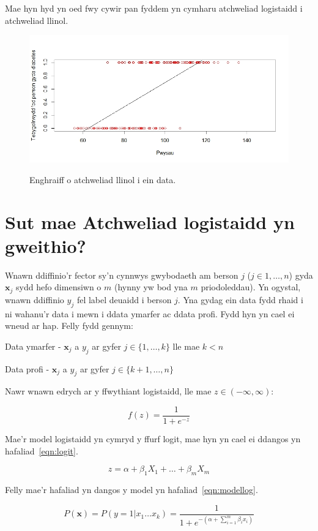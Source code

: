 Mae hyn hyd yn oed fwy cywir pan fyddem yn cymharu atchweliad logistaidd i atchweliad llinol.

\begin{figure}[H]
\begin{center}
\includegraphics[width=0.5\linewidth]{../img/cymharu_llinol.jpeg}
\label{fig:Enghraifft_o_atchweliad_llinol}
\caption{Enghraiff o atchweliad llinol i ein data.}
\end{center}
\end{figure}

\section{Sut mae Atchweliad logistaidd yn gweithio?}

Wnawn ddiffinio'r fector sy'n cynnwys gwybodaeth am berson $j$ ($j \in {1,\dots,n}$) gyda $\mathbf{x}_j$ sydd hefo dimensiwn o $m$ (hynny yw bod yna $m$ priodoleddau). Yn ogystal, wnawn ddiffinio $y_j$ fel label deuaidd i berson $j$. Yna gydag ein data fydd rhaid i ni wahanu'r data i mewn i ddata ymarfer ac ddata profi. Fydd hyn yn cael ei wneud ar hap. Felly fydd gennym:

Data ymarfer - $\mathbf{x}_j$ a $y_j$ ar gyfer $j \in \{ 1,\dots,k\}$ lle mae $k<n$

Data profi - $\mathbf{x}_j$ a $y_j$ ar gyfer $j \in \{ k+1,\dots,n \}$

Nawr wnawn edrych ar y ffwythiant logistaidd, lle mae $z \in (-\infty,\infty)$:

$$ f(z) = \frac{1}{1+e^{-z}} $$ 

Mae'r model logistaidd yn cymryd y ffurf logit, mae hyn yn cael ei ddangos yn hafaliad~\ref{eqn:logit}.

\begin{equation}\label{eqn:logit} 
    z = \alpha + \beta_{1}X_{1} + \dots + \beta_{m}X_{m} 
\end{equation}

Felly mae'r hafaliad yn dangos y model yn hafaliad~\ref{eqn:modellog}.

\begin{equation}\label{eqn:modellog}
    P(\mathbf{x}) = P(y = 1 | x_1 \dots x_k) = \frac{1}{1+e^{-( \alpha + \sum_{i=1}^{m} \beta_{i}x_{i})}} 
\end{equation}

